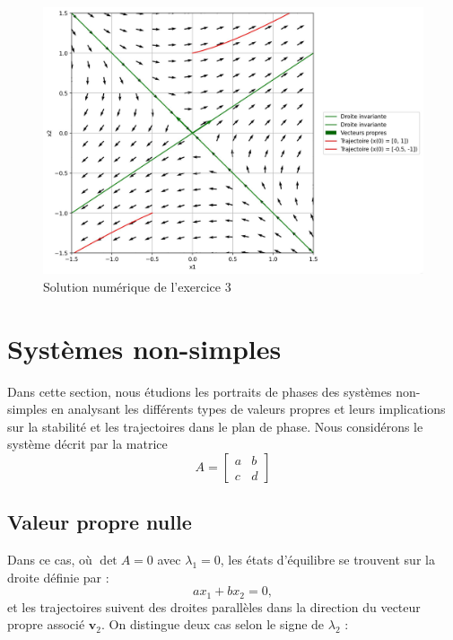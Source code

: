             \begin{figure}[ht!]
                \centering
                \includegraphics[width=\textwidth]{images/pdp_exercice_3.jpg}
                \caption{Solution numérique de l'exercice 3}
                \label{fig:pdp_exercice_3}
            \end{figure}
   \section{Systèmes non-simples}
        Dans cette section, nous étudions les portraits de phases des systèmes non-simples en analysant les différents types de valeurs propres et leurs implications sur la stabilité et les trajectoires dans le plan de phase. Nous considérons le système décrit par la matrice
        \begin{equation}
            A = \begin{bmatrix}
                a & b\\
                c & d
            \end{bmatrix}
        \end{equation}

        \subsection{Valeur propre nulle}
            Dans ce cas, où $\det A = 0$ avec $\lambda_1 = 0$, les états d'équilibre se trouvent sur la droite définie par :
            \begin{equation}
            ax_1 + bx_2 = 0,
            \end{equation}
            et les trajectoires suivent des droites parallèles dans la direction du vecteur propre associé $\mathbf{v}_2$.  On distingue deux cas selon le signe de $\lambda_2$ :
            
